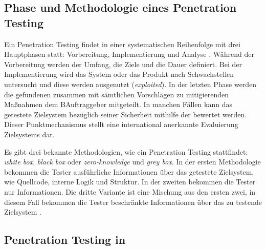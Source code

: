 \subsection{Phase und Methodologie eines Penetration Testing}

Ein Penetration Testing findet in einer systematischen Reihenfolge mit drei Hauptphasen statt: Vorbereitung, Implementierung und Analyse \citep{Hessa_study_pentesting}. Während der Vorbereitung werden der Umfang, die Ziele und die Dauer definiert. Bei der Implementierung wird das System oder das Produkt nach Schwachstellen untersucht und diese werden ausgenutzt (\textit{exploited}). In der letzten Phase werden die gefundenen  zusammen mit sämtlichen Vorschlägen zu mitigierenden Maßnahmen dem BAuftraggeber mitgeteilt. In manchen Fällen kann das getestete Zielsystem bezüglich seiner Sicherheit mithilfe der  bewertet werden. Dieser Punktmechanismus stellt eine international anerkannte Evaluierung Zielsystems dar. 

Es gibt drei bekannte Methodologien, wie ein Penetration Testing stattfindet: \textit{white box}, \textit{black box} oder \textit{zero-knowledge} und \textit{grey box}. In der ersten Methodologie bekommen die Tester ausführliche Informationen über das getestete Zielsystem, wie Quellcode, interne Logik und Struktur. In der zweiten bekommen die Tester nur  Informationen. Die dritte Variante ist eine Mischung aus den ersten zwei, in diesem Fall bekommen die Tester beschränkte Informationen über das zu testende Zielsystem \citep{Ehmer_methoden_testen}.




\subsection{Penetration Testing in }

